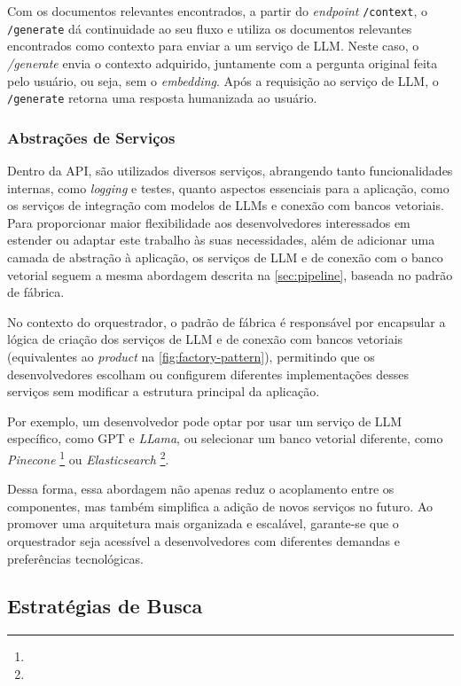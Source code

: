 \documentclass[a4paper, 12pt]{article}
\begin{document}
    Com os documentos relevantes encontrados, a partir do \textit{endpoint} \texttt{/context}, o \texttt{/generate} dá continuidade ao seu fluxo e utiliza os documentos relevantes encontrados como contexto para enviar a um serviço de LLM. Neste caso, o \textit{/generate} envia o contexto adquirido, juntamente com a pergunta original feita pelo usuário, ou seja, sem o \textit{embedding}. Após a requisição ao serviço de LLM, o \texttt{/generate} retorna uma resposta humanizada ao usuário.

    \subsubsection{Abstrações de Serviços} \label{sec:abstraction}

    Dentro da API, são utilizados diversos serviços, abrangendo tanto funcionalidades internas, como \textit{logging} e testes, quanto aspectos essenciais para a aplicação, como os serviços de integração com modelos de LLMs e conexão com bancos vetoriais. Para proporcionar maior flexibilidade aos desenvolvedores interessados em estender ou adaptar este trabalho às suas necessidades, além de adicionar uma camada de abstração à aplicação, os serviços de LLM e de conexão com o banco vetorial seguem a mesma abordagem descrita na \autoref{sec:pipeline}, baseada no padrão de fábrica.

    No contexto do orquestrador, o padrão de fábrica é responsável por encapsular a lógica de criação dos serviços de LLM e de conexão com bancos vetoriais (equivalentes ao \textit{product} na \autoref{fig:factory-pattern}), permitindo que os desenvolvedores escolham ou configurem diferentes implementações desses serviços sem modificar a estrutura principal da aplicação. 
    
    Por exemplo, um desenvolvedor pode optar por usar um serviço de LLM específico, como GPT e \textit{LLama}, ou selecionar um banco vetorial diferente, como \textit{Pinecone} \footnote{} ou \textit{Elasticsearch} \footnote{}.
    
    Dessa forma, essa abordagem não apenas reduz o acoplamento entre os componentes, mas também simplifica a adição de novos serviços no futuro. Ao promover uma arquitetura mais organizada e escalável, garante-se que o orquestrador seja acessível a desenvolvedores com diferentes demandas e preferências tecnológicas.

    \subsection{Estratégias de Busca} \label{sec:strategies}
\end{document}
